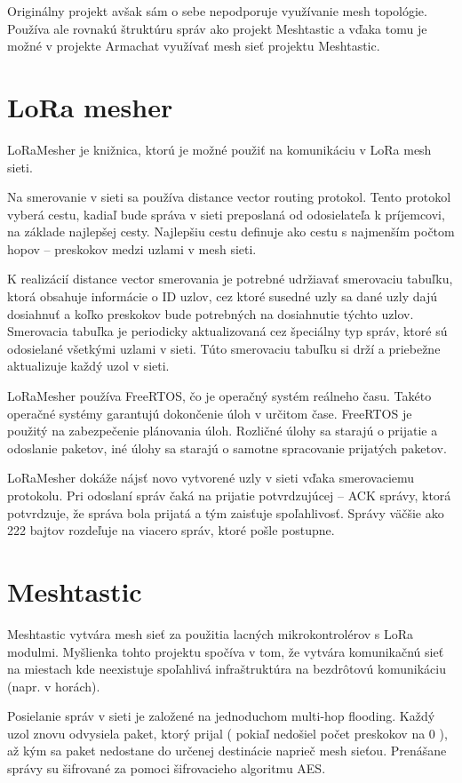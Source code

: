 \documentclass[slovak,master]{diploma}
\begin{document}
Originálny projekt avšak sám o sebe nepodporuje využívanie mesh topológie. Používa ale rovnakú štruktúru správ ako projekt Meshtastic a vďaka tomu je možné 
v projekte Armachat využívať mesh sieť projektu Meshtastic.

\section{LoRa mesher}
LoRaMesher \cite{loramesher} je knižnica, ktorú je možné použiť na komunikáciu v LoRa mesh sieti.

Na smerovanie v sieti sa používa distance vector routing protokol. Tento protokol vyberá cestu, kadiaľ bude správa v sieti preposlaná od odosielateľa k príjemcovi, na základe 
najlepšej cesty. Najlepšiu cestu definuje ako cestu s najmenším počtom hopov -- preskokov medzi uzlami v mesh sieti.

K realizácií distance vector smerovania je potrebné udržiavať smerovaciu tabuľku, ktorá obsahuje informácie o ID uzlov, cez ktoré susedné uzly sa dané uzly dajú dosiahnuť a 
koľko preskokov bude potrebných na dosiahnutie týchto uzlov. Smerovacia tabuľka je periodicky aktualizovaná cez špeciálny typ správ, ktoré sú odosielané 
všetkými uzlami v sieti. Túto smerovaciu tabuľku si drží a priebežne aktualizuje každý uzol v sieti.

LoRaMesher používa FreeRTOS, čo je operačný systém reálneho času. Takéto operačné systémy garantujú dokončenie úloh v určitom čase.
FreeRTOS je použitý na zabezpečenie plánovania úloh. Rozličné úlohy sa starajú o prijatie a odoslanie paketov, iné úlohy sa starajú o samotne 
spracovanie prijatých paketov.

LoRaMesher dokáže nájsť novo vytvorené uzly v sieti vďaka smerovaciemu protokolu. Pri odoslaní správ čaká na prijatie potvrdzujúcej -- ACK správy, ktorá potvrdzuje, 
že správa bola prijatá a tým zaisťuje spoľahlivosť. Správy väčšie ako 222 bajtov rozdeľuje na viacero správ, ktoré pošle postupne.

\section{Meshtastic}
Meshtastic \cite{meshtastic} vytvára mesh sieť za použitia lacných mikrokontrolérov s LoRa modulmi.
Myšlienka tohto projektu spočíva v tom, že vytvára komunikačnú sieť na miestach kde neexistuje spoľahlivá infraštruktúra na bezdrôtovú komunikáciu (napr. v horách).

Posielanie správ v sieti je založené na jednoduchom multi-hop flooding.
Každý uzol znovu odvysiela paket, ktorý prijal ( pokiaľ nedošiel počet preskokov na 0 ), až kým sa paket nedostane do určenej destinácie naprieč mesh sieťou.
Prenášane správy su šifrované za pomoci šifrovacieho algoritmu AES.
\end{document}
